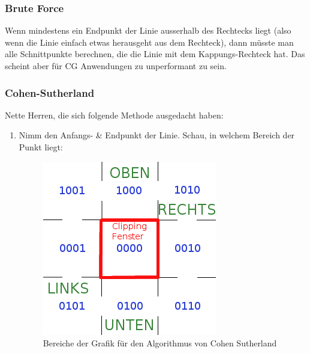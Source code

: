 \subsubsection{Brute Force}
Wenn mindestens ein Endpunkt der Linie ausserhalb des Rechtecks liegt (also wenn die Linie einfach etwas herausgeht aus dem Rechteck), dann müsste man alle Schnittpunkte berechnen, die die Linie mit dem Kappungs-Rechteck hat. Das scheint aber für CG Anwendungen zu unperformant zu sein.

\subsubsection{Cohen-Sutherland}
Nette Herren, die sich folgende Methode ausgedacht haben:
\begin{enumerate}
	\item Nimm den Anfangs- \& Endpunkt der Linie. Schau, in welchem Bereich der Punkt liegt:
	
	\begin{figure}[!ht]
		\centering
		\includegraphics[width=0.3\linewidth]{fig/cohen_sutherland}
		\caption{Bereiche der Grafik für den Algorithmus von Cohen Sutherland}
		\label{fig:cohen_sutherland}
	\end{figure}
	

\end{enumerate}
